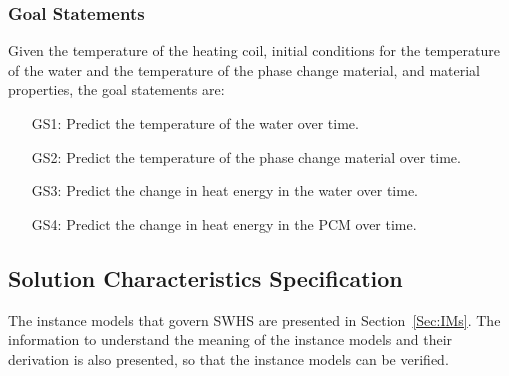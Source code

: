 \documentclass[12pt]{article}
\begin{document}
\subsubsection{Goal Statements}
\label{Sec:GoalStmt}
Given the temperature of the heating coil, initial conditions for the temperature of the water and the temperature of the phase change material, and material properties, the goal statements are:
\begin{itemize}
\item[GS1:]Predict the temperature of the water over time.
\item[GS2:]Predict the temperature of the phase change material over time.
\item[GS3:]Predict the change in heat energy in the water over time.
\item[GS4:]Predict the change in heat energy in the PCM over time.
\end{itemize}
\subsection{Solution Characteristics Specification}
\label{Sec:SolCharSpec}
The instance models that govern SWHS are presented in Section~\ref{Sec:IMs}. The information to understand the meaning of the instance models and their derivation is also presented, so that the instance models can be verified.
\end{document}

